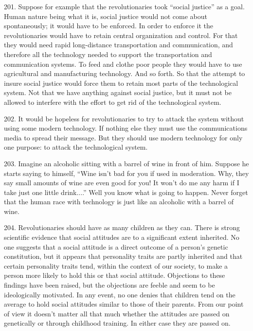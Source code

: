 \documentclass{article}
\begin{document}
201. Suppose for example that the revolutionaries took “social justice” as a goal. Human nature 
being what it is, social justice would not come about spontaneously; it would have to be 
enforced. In order to enforce it the revolutionaries would have to retain central organization and 
control. For that they would need rapid long-distance transportation and communication, and 
therefore all the technology needed to support the transportation and communication systems. To 
feed and clothe poor people they would have to use agricultural and manufacturing 
technology. And so forth. So that the attempt to insure social justice would force them to retain 
most parts of the technological system. Not that we have anything against social justice, but it 
must not be allowed to interfere with the effort to get rid of the technological system. \vspace{\baselineskip}

202. It would be hopeless for revolutionaries to try to attack the system without using some 
modern technology. If nothing else they must use the communications media to spread their 
message. But they should use modern technology for only one purpose: to attack the technological 
system. \vspace{\baselineskip}

203. Imagine an alcoholic sitting with a barrel of wine in front of him. Suppose he starts saying 
to himself, “Wine isn’t bad for you if used in moderation. Why, they say small amounts of wine 
are even good for you! It won’t do me any harm if I take just one little drink....” Well you know 
what is going to happen. Never forget that the human race with technology is just like an alcoholic 
with a barrel of wine. \vspace{\baselineskip}

204. Revolutionaries should have as many children as they can. There is strong scientific 
evidence that social attitudes are to a significant extent inherited. No one suggests that a social 
attitude is a direct outcome of a person’s genetic constitution, but it appears that personality traits 
are partly inherited and that certain personality traits tend, within the context of our society, to 
make a person more likely to hold this or that social attitude. Objections to these findings have 
been raised, but the objections are feeble and seem to be ideologically motivated. In any event, no 
one denies that children tend on the average to hold social attitudes similar to those of their 
parents. From our point of view it doesn’t matter all that much whether the attitudes are passed 
on genetically or through childhood training. In either case they are passed on. \vspace{\baselineskip}
\end{document}
